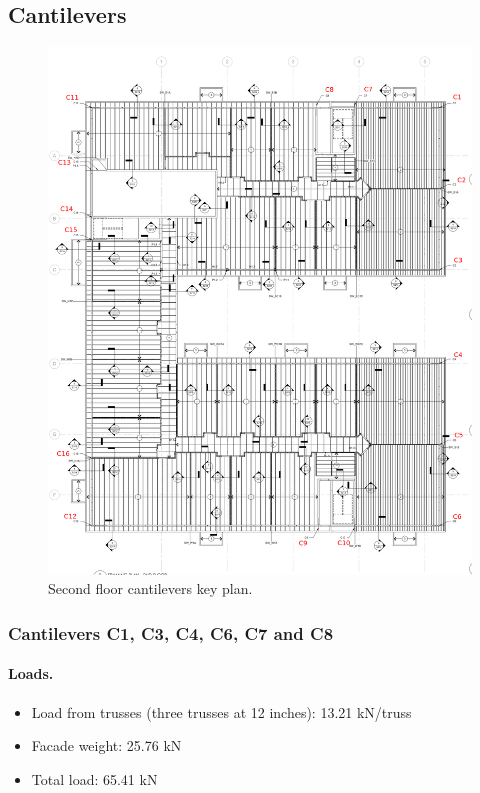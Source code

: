 \subsection{Cantilevers}

\begin{figure}
  \begin{center}
  \includegraphics[width=120mm]{figures/cantilevers_key_plan}
  \end{center}
  \caption{Second floor cantilevers key plan.}\label{fg_2nd_floor_cantilevers_key_plan}
\end{figure}

\subsubsection{Cantilevers C1, C3, C4, C6, C7 and C8}

\paragraph{Loads.}

\begin{itemize}
\item Load from trusses (three trusses at 12 inches): 13.21 kN/truss
\item Facade weight: 25.76 kN
\item Total load: 65.41 kN
\end{itemize}


